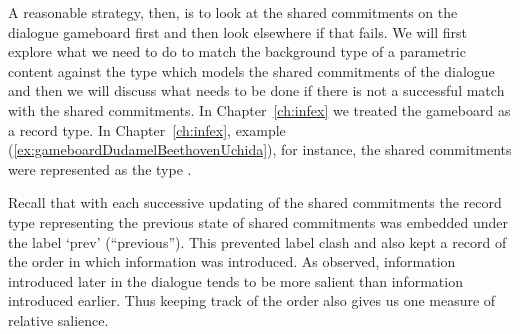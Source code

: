 A reasonable strategy, then, is to look at the shared
commitments on the dialogue gameboard first and then look elsewhere if
that fails.  We will first explore what we need to do to match the
background type of a parametric content against the type which models the
shared commitments of the dialogue and then we will discuss what needs
to be done if there is not a successful match with the shared
commitments. In Chapter~\ref{ch:infex}  we treated the gameboard as a
record type.  In Chapter~\ref{ch:infex}, example 
(\ref{ex:gameboardDudamelBeethovenUchida}), for instance, the shared commitments
were represented as the type \nexteg{}.
\begin{ex} 
\end{ex} 
Recall that with each successive updating of the shared commitments
the record type representing the previous state of shared commitments
was embedded under the label `prev' (``previous'').  This prevented
label clash and also kept a record of the order in which information
was introduced.  As \cite{Lewis1979} observed, information introduced
later in the dialogue tends to be more salient than information
introduced earlier.  Thus keeping track of the order also gives us one
measure of relative salience.

